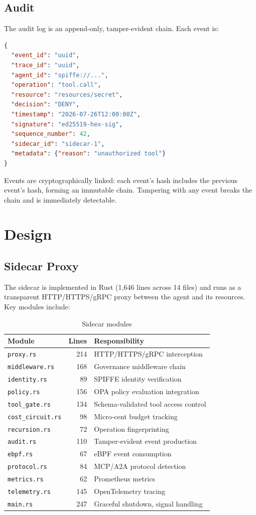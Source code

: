 \documentclass[runningheads]{llncs}
\begin{document}
\subsection{Audit}

The audit log is an append-only, tamper-evident chain. Each event is:
\begin{lstlisting}[language=JSON]
{
  "event_id": "uuid",
  "trace_id": "uuid",
  "agent_id": "spiffe://...",
  "operation": "tool.call",
  "resource": "resources/secret",
  "decision": "DENY",
  "timestamp": "2026-07-26T12:00:00Z",
  "signature": "ed25519-hex-sig",
  "sequence_number": 42,
  "sidecar_id": "sidecar-1",
  "metadata": {"reason": "unauthorized tool"}
}
\end{lstlisting}

Events are cryptographically linked: each event's hash includes the previous event's hash, forming an immutable chain. Tampering with any event breaks the chain and is immediately detectable.

\section{Design}

\subsection{Sidecar Proxy}

The sidecar is implemented in Rust (1,646 lines across 14 files) and runs as a transparent HTTP/HTTPS/gRPC proxy between the agent and its resources. Key modules include:

\begin{table}[H]
\centering
\caption{Sidecar modules}
\begin{tabular}{lrl}
\toprule
Module & Lines & Responsibility \\
\midrule
\texttt{proxy.rs} & 214 & HTTP/HTTPS/gRPC interception \\
\texttt{middleware.rs} & 168 & Governance middleware chain \\
\texttt{identity.rs} & 89 & SPIFFE identity verification \\
\texttt{policy.rs} & 156 & OPA policy evaluation integration \\
\texttt{tool\_gate.rs} & 134 & Schema-validated tool access control \\
\texttt{cost\_circuit.rs} & 98 & Micro-cent budget tracking \\
\texttt{recursion.rs} & 72 & Operation fingerprinting \\
\texttt{audit.rs} & 110 & Tamper-evident event production \\
\texttt{ebpf.rs} & 67 & eBPF event consumption \\
\texttt{protocol.rs} & 84 & MCP/A2A protocol detection \\
\texttt{metrics.rs} & 62 & Prometheus metrics \\
\texttt{telemetry.rs} & 145 & OpenTelemetry tracing \\
\texttt{main.rs} & 247 & Graceful shutdown, signal handling \\
\bottomrule
\end{tabular}
\end{table}
\end{document}
